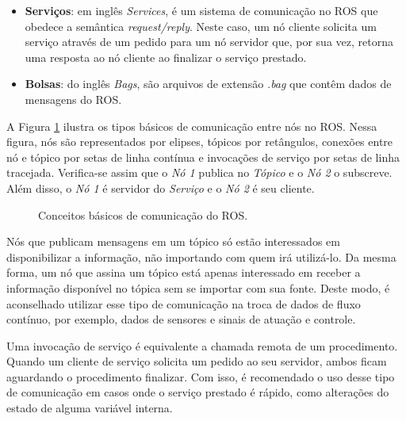 \begin{itemize}
                    \item \textbf{Serviços}: em inglês \textit{Services}, é um sistema de comunicação no ROS que obedece a semântica \textit{request/reply}. Neste caso, um nó cliente solicita um serviço através de um pedido para um nó servidor que, por sua vez, retorna uma resposta ao nó cliente ao finalizar o serviço prestado.
                    
                    \item \textbf{Bolsas}: do inglês \textit{Bags}, são arquivos de extensão \textit{.bag} que contêm dados de mensagens do ROS.
                \end{itemize}
                
                A Figura \ref{fig:ros_conceitos_basicos} ilustra os tipos básicos de comunicação entre nós no ROS. Nessa figura, nós são representados por elipses, tópicos por retângulos, conexões entre nó e tópico por setas de linha contínua e invocações de serviço por setas de linha tracejada. Verifica-se assim que o \textit{Nó 1} publica no \textit{Tópico} e o \textit{Nó 2} o subscreve. Além disso, o \textit{Nó 1} é servidor do \textit{Serviço} e o \textit{Nó 2} é seu cliente.
                
                \begin{figure}
                    \centering
                    
                    \caption{Conceitos básicos de comunicação do ROS.}
                    \label{fig:ros_conceitos_basicos}
                \end{figure}
                
                Nós que publicam mensagens em um tópico só estão interessados em disponibilizar a informação, não importando com quem irá utilizá-lo. Da mesma forma, um nó que assina um tópico está apenas interessado em receber a informação disponível no tópica sem se importar com sua fonte. Deste modo, é aconselhado utilizar esse tipo de comunicação na troca de dados de fluxo contínuo, por exemplo, dados de sensores e sinais de atuação e controle.
                
                Uma invocação de serviço é equivalente a chamada remota de um procedimento. Quando um cliente de serviço solicita um pedido ao seu servidor, ambos ficam aguardando o procedimento finalizar. Com isso, é recomendado o uso desse tipo de comunicação em casos onde o serviço prestado é rápido, como alterações do estado de alguma variável interna.
                
